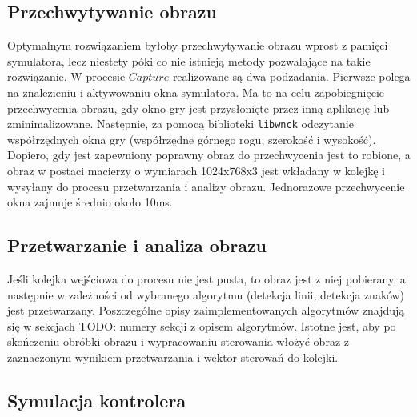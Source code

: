 \subsection{Przechwytywanie obrazu}
\label{sec:mechanism}
Optymalnym rozwiązaniem byłoby przechwytywanie obrazu wprost z pamięci symulatora, lecz niestety póki co nie istnieją metody pozwalające na takie rozwiązanie. %
W procesie $Capture$ realizowane są dwa podzadania. 
Pierwsze polega na znalezieniu i aktywowaniu okna symulatora. 
Ma to na celu zapobiegnięcie przechwycenia obrazu, gdy okno gry jest przysłonięte przez inną aplikację lub zminimalizowane. 
Następnie, za pomocą biblioteki \texttt{libwnck} odczytanie współrzędnych okna gry (współrzędne górnego rogu, szerokość i wysokość). 
Dopiero, gdy jest zapewniony poprawny obraz do przechwycenia jest to robione, a obraz w postaci macierzy o wymiarach 1024x768x3 jest wkładany w kolejkę i wysyłany do procesu przetwarzania i analizy obrazu. %
Jednorazowe przechwycenie okna zajmuje średnio około 10ms.

\subsection{Przetwarzanie i analiza obrazu}

Jeśli kolejka wejściowa do procesu nie jest pusta, to obraz jest z niej pobierany, a następnie w zależności od wybranego algorytmu (detekcja linii, detekcja znaków) jest przetwarzany. 
Poszczególne opisy zaimplementowanych algorytmów znajdują się w sekcjach TODO: numery sekcji z opisem algorytmów. %
Istotne jest, aby po skończeniu obróbki obrazu i wypracowaniu sterowania włożyć obraz z zaznaczonym wynikiem przetwarzania i wektor sterowań do kolejki. %

\subsection{Symulacja kontrolera}

